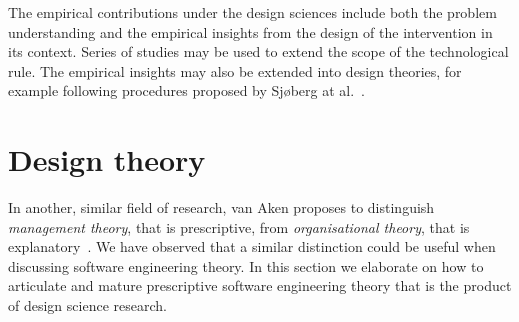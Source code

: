 \documentclass[graybox]{svmult}
\newcommand{\emelie}[1]{\textcolor{red}{{\it [Emelie says: #1]}}}
\newcommand{\per}[1]{\textcolor{cyan}{{\it [Per says: #1]}}}
\newcommand{\emelie}[1]{}
\newcommand{\per}[1]{}
\begin{document}


The empirical contributions under the design sciences include both the problem understanding and the empirical insights from the design of the intervention in its context. Series of studies may be used to extend the scope of the technological rule. The empirical insights may also be extended into design theories, for example following procedures proposed by Sj{\o}berg at al.~\cite{sjoberg2008building}.

\section{Design theory}
In another, similar field of research, van Aken proposes to distinguish \emph{management theory}, that is prescriptive, from \emph{organisational theory}, that is explanatory~\cite{van_aken_management_2005}. We have observed that a similar distinction could be useful when discussing software engineering theory. In this section we elaborate on how to articulate and mature prescriptive software engineering theory that is the product of design science research. 
\end{document}
